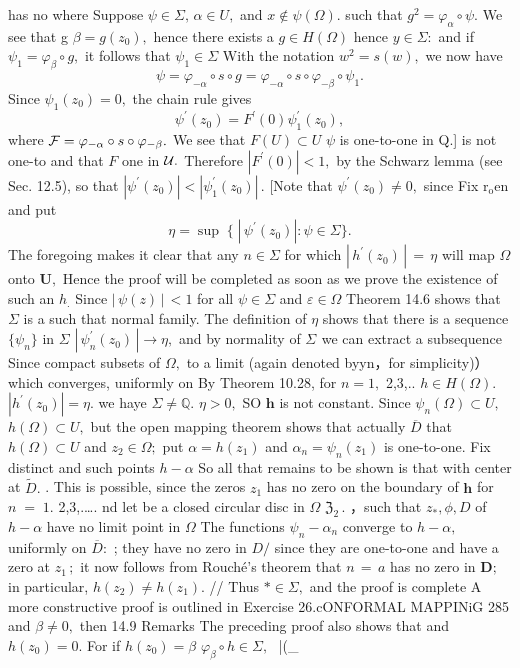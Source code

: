has no where Suppose $\psi\in\Sigma,\,\alpha\in U,$ and $x\notin\psi(\Omega).$ such that $g^{2}=\varphi_{\alpha}\circ\psi.$ We see that g $\beta=g(z_{0}),$ hence there exists a $g\in H(\Omega)$ hence $y\in\Sigma\colon$ and if $\psi_{1}=\varphi_{\beta}\circ g,$ it follows that $\psi_{1}\in\Sigma$ With the notation $w^{2}=s(w),$ we now have $$ \psi=\varphi_{-\alpha}\circ s\circ g=\varphi_{-\alpha}\circ s\circ\varphi_{-\beta}\circ\psi_{1}. $$ Since $\psi_{1}(z_{0})=0,$ the chain rule gives $$ \psi^{\prime}(z_{0})=F^{\prime}(0)\psi_{1}^{\prime}(z_{0}), $$ where ${\cal F}=\varphi_{-\alpha}\circ s\circ\varphi_{-\beta}.$ We see that $F(U)\subset U$ $\psi$ is one-to-one in Q.] is not one-to and that ${\mathbf{}}F$ one in ${\cal U}.$ Therefore $|F^{\prime}(0)|<1,$ by the Schwarz lemma (see Sec. 12.5), so that $|\psi^{\prime}(z_{0})|<|\psi_{1}^{\prime}(z_{0})|\,.$ [Note that $\psi^{\prime}(z_{0})\neq0,$ since Fix $\scriptstyle\mathrm{r_{o}}\mathrm{en}$ and put $$ \eta=\operatorname*{sup}\;\{\;|\,\psi^{\prime}(z_{0})|\!:\psi\in\Sigma\}. $$ The foregoing makes it clear that any $\scriptstyle n\in\Sigma$ for which $\left|\,h^{\prime}(z_{0})\,\right|\,=\,\eta$ will map $\Omega$ onto ${\boldsymbol{U}},$ Hence the proof will be completed as soon as we prove the existence of such an $h_{\mathrm{.}}$ Since $|\,\psi(z)\,|\,<1$ for all $\psi\in\Sigma$ and $\varepsilon\in\Omega$ Theorem 14.6 shows that $\Sigma$ is a such that normal family. The definition of $\textstyle\eta$ shows that there is a sequence $\{\psi_{n}\}$ in $\Sigma$ $|\,\psi_{n}^{\prime}(z_{0})\,|\to\eta,$ and by normality of $\Sigma_{}^{}$ we can extract a subsequence Since compact subsets of $\Omega,$ to a limit (again denoted by{yn}，for simplicity)） which converges, uniformly on By Theorem 10.28, for $n=1,$ 2,3,.. $h\in H(\Omega).$ $\left|{h^{\prime}}(z_{0})\right|=\eta.$ we haye $\Sigma\neq\mathbb{Q}.$ $\eta>0,$ SO ${\boldsymbol{h}}$ is not constant. Since $\psi_{n}(\Omega)\subset U,$ $h(\Omega)\subset U,$ but the open mapping theorem shows that actually $\overline{{D}}$ that $h(\Omega)\subset U$ and $z_{2}\in\Omega;$ put $\alpha=h(z_{1})$ and $\alpha_{n}=\psi_{n}(z_{1})$ is one-to-one. Fix distinct and such points $h-\alpha$ So all that remains to be shown is that with center at ${\tilde{D}}.$ . This is possible, since the zeros $z_{1}$ has no zero on the boundary of ${\boldsymbol{h}}$ for $\scriptstyle n\;=\;1.$ 2,3,.…. nd let be a closed circular disc in $\Omega$ ${\mathfrak{Z}}_{2}\,.$ ，such that $\scriptstyle z_{*},\phi,D$ of $h-\alpha$ have no limit point in $\Omega$ The functions $\psi_{n}-\alpha_{n}$ converge to $h-\alpha,$ uniformly on ${\overline{{D}}}\colon$ ; they have no zero in $D\!\!\!\!/$ since they are one-to-one and have a zero at $z_{1}\,;$ it now follows from Rouché's theorem that $\scriptstyle n\,=\,a$ has no zero in ${\boldsymbol{D}};$ in particular, $h(z_{2})\neq h(z_{1}).$ // Thus $*\in\Sigma,$ and the proof is complete A more constructive proof is outlined in Exercise 26.cONFORMAL MAPPINiG 285 and $\beta\neq0,$ then 14.9 Remarks The preceding proof also shows that and $h(z_{0})=0.$ For if $h(z_{0})=\beta$ $\varphi_{\beta}\circ h\in\Sigma,$ $$ |(\varphi_{\beta}\circ 